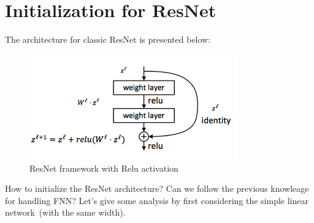 \section{Initialization for ResNet}
The architecture for classic ResNet is presented below:
\begin{figure}[H]
\centering
\includegraphics[width=0.8\textwidth]{Fifth_lecture/f_1}
\caption{ResNet framework with Relu activation}
\end{figure}
How to initialize the ResNet architecture? Can we follow the previous knowleage for handling FNN?
Let's give some analysis by first considering the simple linear network~(with the same width).

